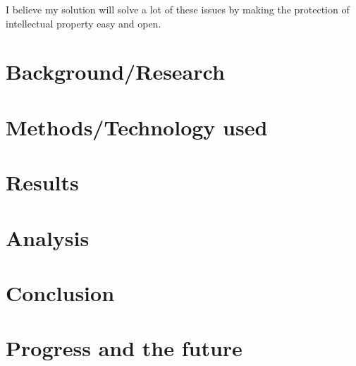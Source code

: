 \documentclass[11pt]{report}
\begin{document}
I believe my solution will solve a lot of these issues by making the protection of intellectual property easy and open.

\chapter{Background/Research}

\chapter{Methods/Technology used}

\chapter{Results}

\chapter{Analysis}

\chapter{Conclusion}

\chapter{Progress and the future}


\end{document}
